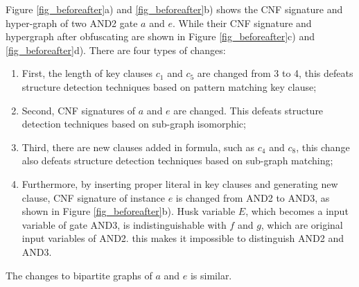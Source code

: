 \documentclass[runningheads,a4paper]{llncs}
\begin{document}
Figure \ref{fig_beforeafter}a) and \ref{fig_beforeafter}b) shows the CNF signature and hyper-graph of two AND2 gate $a$ and $e$.
While their CNF signature and hypergraph after obfuscating are shown in Figure \ref{fig_beforeafter}c) and \ref{fig_beforeafter}d).
There are four types of changes:
\begin{enumerate}
 \item First, 
 the length of key clauses $c_1$ and $c_5$ are changed from 3 to 4, 
this defeats structure detection techniques \cite{t9} based on pattern matching key clause;
 \item Second, 
 CNF signatures of $a$ and $e$ are changed.
This defeats structure detection techniques\cite{t8} based on sub-graph isomorphic;
 \item Third, 
 there are new clauses added in formula, 
 such as $c_4$ and $c_8$, 
this change also defeats structure detection techniques\cite{t8} based on sub-graph matching;
 \item Furthermore, 
 by inserting proper literal in key clauses and generating new clause, 
 CNF signature of instance $e$ is changed from AND2 to AND3, 
as shown in Figure \ref{fig_beforeafter}b).
Husk variable $E$,
which becomes a input variable of gate AND3, 
is indistinguishable with $f$ and $g$,
which are original input variables of AND2.
this makes it impossible to distinguish AND2 and AND3. 
\end{enumerate}


The changes to bipartite graphs of $a$ and $e$ is similar. 


\end{document}
